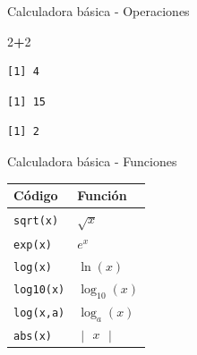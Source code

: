 \documentclass[
  ignorenonframetext,
]{beamer}
\newenvironment{Shaded}{\begin{snugshade}}{\end{snugshade}}
\newcommand{\DecValTok}[1]{\textcolor[rgb]{0.00,0.00,0.81}{#1}}
\newcommand{\OperatorTok}[1]{\textcolor[rgb]{0.81,0.36,0.00}{\textbf{#1}}}
\begin{document}
\begin{frame}[fragile]{Calculadora básica - Operaciones}
\protect\hypertarget{calculadora-buxe1sica---operaciones-2}{}

\begin{Shaded}
\begin{Highlighting}[]
\DecValTok{2}\OperatorTok{+}\DecValTok{2}
\end{Highlighting}
\end{Shaded}

\begin{verbatim}
[1] 4
\end{verbatim}

\begin{Shaded}
\end{Shaded}

\begin{verbatim}
[1] 15
\end{verbatim}

\begin{Shaded}
\end{Shaded}

\begin{verbatim}
[1] 2
\end{verbatim}

\end{frame}

\begin{frame}[fragile]{Calculadora básica - Funciones}
\protect\hypertarget{calculadora-buxe1sica---funciones}{}

\begin{longtable}[]{@{}ll@{}}
\toprule
Código & Función\tabularnewline
\midrule
\endhead
\texttt{sqrt(x)} & \(\sqrt{x}\)\tabularnewline
\texttt{exp(x)} & \(e^x\)\tabularnewline
\texttt{log(x)} & \(\ln(x)\)\tabularnewline
\texttt{log10(x)} & \(\log_{10}(x)\)\tabularnewline
\texttt{log(x,a)} & \(\log_a(x)\)\tabularnewline
\texttt{abs(x)} & \(\begin{vmatrix}x\end{vmatrix}\)\tabularnewline
\bottomrule
\end{longtable}

\end{frame}
\end{document}
